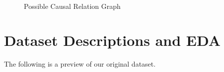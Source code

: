 \documentclass{article}
\begin{document}
\begin{minipage}[t]{0.3\linewidth}
\begin{figure}[H]
\centering
{}
\caption{\label{fig:relation}Possible Causal Relation Graph}
\end{figure}
\end{minipage}

\section{Dataset Descriptions and EDA}
The following is a preview of our original dataset.
\end{document}
